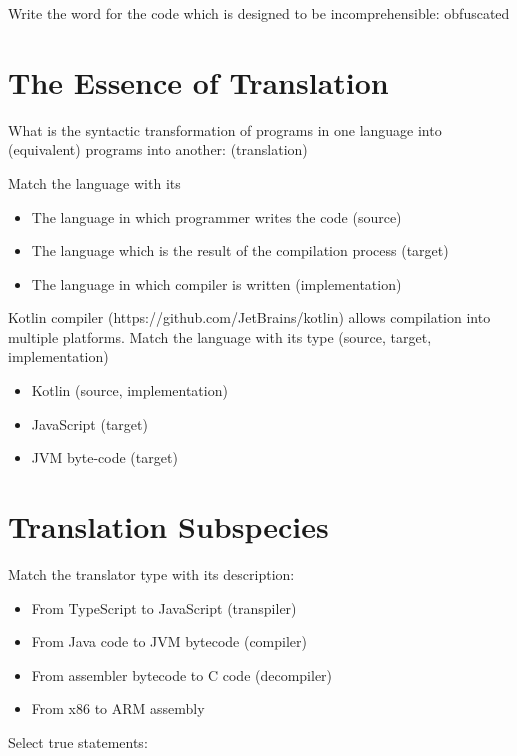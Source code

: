 Write the word for the code which is designed to be incomprehensible:
obfuscated

\section{The Essence of Translation}
What is the syntactic transformation of programs in one language into (equivalent) programs into another:
(translation)

Match the language with its

\begin{itemize}
\item The language in which programmer writes the code (source)
\item The language which is the result of the compilation process (target)
\item The language in which compiler is written (implementation)
\end{itemize}


Kotlin compiler (https://github.com/JetBrains/kotlin) allows compilation into multiple platforms.
Match the language with its type  (source, target, implementation)
\begin{itemize}
    \item Kotlin (source, implementation)
    \item JavaScript (target)
    \item JVM byte-code (target)
\end{itemize}



\section{Translation Subspecies}

Match the translator type with its description:
\begin{itemize}
    \item From TypeScript to JavaScript (transpiler)
    \item From Java code to JVM bytecode (compiler)
    \item From assembler bytecode to C code (decompiler)
    \item From x86 to ARM assembly
\end{itemize}

Select true statements:
\begin{itemize}

\end{itemize}


